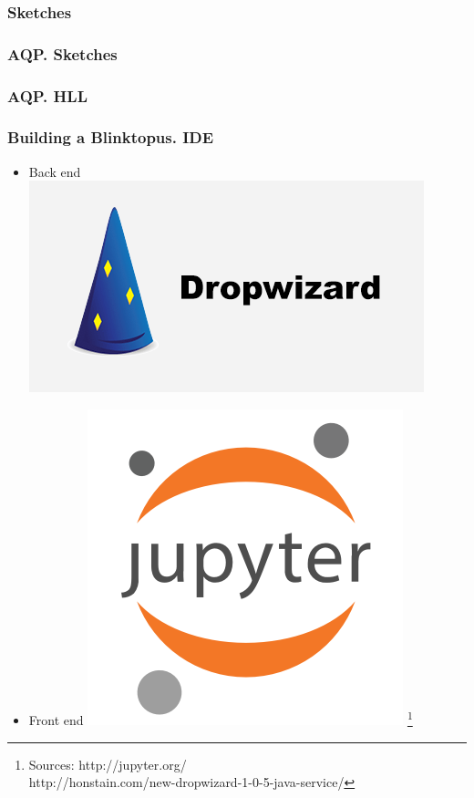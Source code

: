\documentclass{beamer}
\begin{document}
\subsubsection{Sketches}
\begin{frame}
\frametitle{AQP. Sketches}

\end{frame}

\begin{frame}
\frametitle{AQP. HLL}

\end{frame}

\begin{frame}
\frametitle{Building a Blinktopus. IDE}
\begin{itemize}
\item{Back end}
\includegraphics[scale=0.3]{img/dropwizard.png}
\vspace{0.25 cm}
\item{Front end}
\includegraphics[scale=0.2]{img/jpnotebook.png}
\footnote{\tiny 
Sources: http://jupyter.org/\\
http://honstain.com/new-dropwizard-1-0-5-java-service/}
\end{itemize}
\end{frame}
\end{document}

